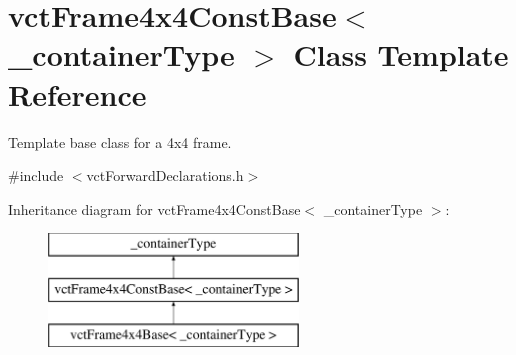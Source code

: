 \hypertarget{classvct_frame4x4_const_base}{}\section{vct\+Frame4x4\+Const\+Base$<$ \+\_\+container\+Type $>$ Class Template Reference}
\label{classvct_frame4x4_const_base}


Template base class for a 4x4 frame.  




{\ttfamily \#include $<$vct\+Forward\+Declarations.\+h$>$}

Inheritance diagram for vct\+Frame4x4\+Const\+Base$<$ \+\_\+container\+Type $>$\+:\begin{figure}[H]
\begin{center}
\leavevmode
\includegraphics[height=3.000000cm]{d6/d73/classvct_frame4x4_const_base}
\end{center}
\end{figure}
